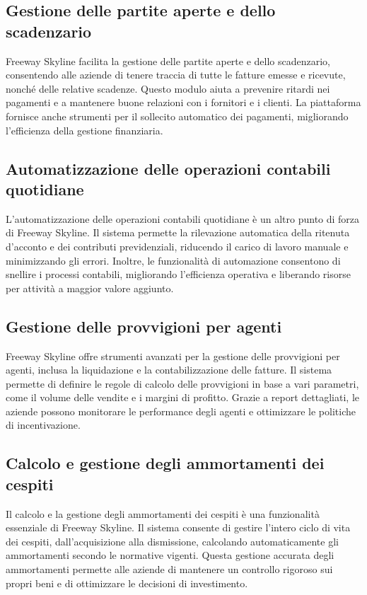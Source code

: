 \documentclass{article}
\begin{document}
\subsection{Gestione delle partite aperte e dello scadenzario}

Freeway Skyline facilita la gestione delle partite aperte e dello scadenzario, consentendo alle aziende di tenere traccia di tutte le fatture emesse e ricevute, nonché delle relative scadenze. Questo modulo aiuta a prevenire ritardi nei pagamenti e a mantenere buone relazioni con i fornitori e i clienti. La piattaforma fornisce anche strumenti per il sollecito automatico dei pagamenti, migliorando l'efficienza della gestione finanziaria.

\subsection{Automatizzazione delle operazioni contabili quotidiane}

L'automatizzazione delle operazioni contabili quotidiane è un altro punto di forza di Freeway Skyline. Il sistema permette la rilevazione automatica della ritenuta d'acconto e dei contributi previdenziali, riducendo il carico di lavoro manuale e minimizzando gli errori. Inoltre, le funzionalità di automazione consentono di snellire i processi contabili, migliorando l'efficienza operativa e liberando risorse per attività a maggior valore aggiunto.

\subsection{Gestione delle provvigioni per agenti}

Freeway Skyline offre strumenti avanzati per la gestione delle provvigioni per agenti, inclusa la liquidazione e la contabilizzazione delle fatture. Il sistema permette di definire le regole di calcolo delle provvigioni in base a vari parametri, come il volume delle vendite e i margini di profitto. Grazie a report dettagliati, le aziende possono monitorare le performance degli agenti e ottimizzare le politiche di incentivazione.

\subsection{Calcolo e gestione degli ammortamenti dei cespiti}

Il calcolo e la gestione degli ammortamenti dei cespiti è una funzionalità essenziale di Freeway Skyline. Il sistema consente di gestire l'intero ciclo di vita dei cespiti, dall'acquisizione alla dismissione, calcolando automaticamente gli ammortamenti secondo le normative vigenti. Questa gestione accurata degli ammortamenti permette alle aziende di mantenere un controllo rigoroso sui propri beni e di ottimizzare le decisioni di investimento.
\end{document}
